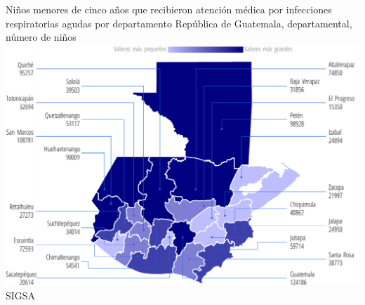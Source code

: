
%
{%
}%
{%
	Niños menores de cinco años que recibieron atención médica por infecciones respiratorias agudas por departamento} %
{%
	República de Guatemala, departamental, número de niños} %
{%
	\includegraphics[width=52\cuadri]{graficas/5_17.pdf}}%
{%
	SIGSA} %
